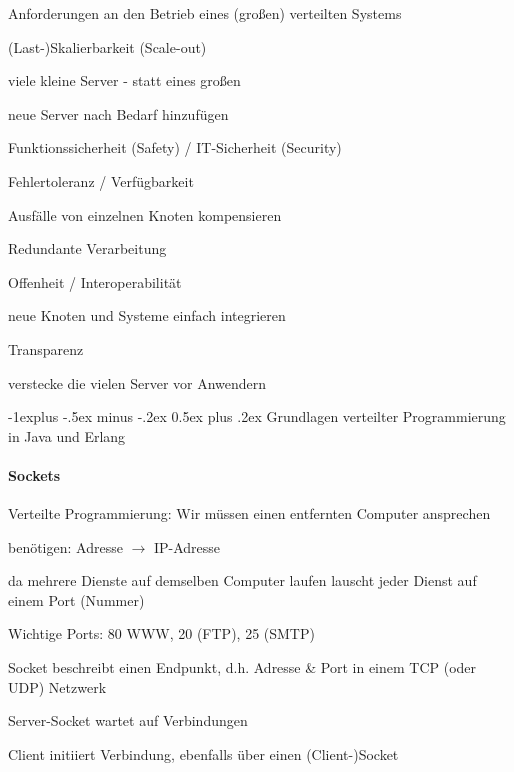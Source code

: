 \documentclass[10pt]{article}
\makeatletter
\renewcommand{\subsection}{\@startsection{subsection}{2}{0mm}%
                                {-1explus -.5ex minus -.2ex}%
                                {0.5ex plus .2ex}%
                                {\normalfont\normalsize\bfseries}}
\makeatother
\begin{document}
Anforderungen an den Betrieb eines (großen) verteilten Systems
\begin{itemize*}
  \item (Last-)Skalierbarkeit (Scale-out)
  \begin{itemize*}
    \item viele kleine Server - statt eines großen
    \item neue Server nach Bedarf hinzufügen
  \end{itemize*}
  \item Funktionssicherheit (Safety) / IT-Sicherheit (Security)
  \item Fehlertoleranz / Verfügbarkeit
  \begin{itemize*}
    \item Ausfälle von einzelnen Knoten kompensieren
    \item Redundante Verarbeitung
  \end{itemize*}
  \item Offenheit / Interoperabilität
  \begin{itemize*}
    \item neue Knoten und Systeme einfach integrieren
  \end{itemize*}
  \item Transparenz
  \begin{itemize*}
    \item verstecke die vielen Server vor Anwendern
  \end{itemize*}
\end{itemize*}


\subsection{Grundlagen verteilter Programmierung in Java und Erlang}
\paragraph{Sockets}
\begin{itemize*}
  \item Verteilte Programmierung: Wir müssen einen entfernten Computer ansprechen
  \item benötigen: Adresse $\rightarrow$ IP-Adresse
  \item da mehrere Dienste auf demselben Computer laufen lauscht jeder Dienst auf einem Port (Nummer)
  \begin{itemize*}
    \item Wichtige Ports: 80 WWW, 20 (FTP), 25 (SMTP)
  \end{itemize*}
  \item Socket beschreibt einen Endpunkt, d.h. Adresse \& Port in einem TCP (oder UDP) Netzwerk
  \item Server-Socket wartet auf Verbindungen
  \item Client initiiert Verbindung, ebenfalls über einen (Client-)Socket
\end{itemize*}
\end{document}
